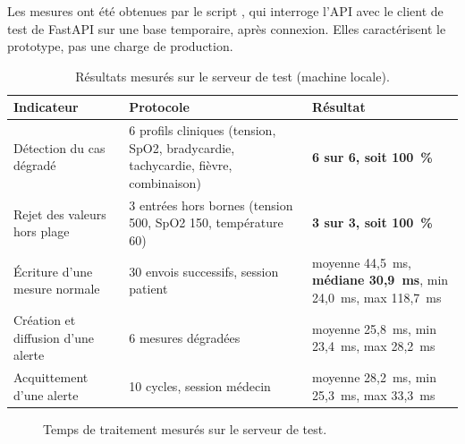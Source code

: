 Les mesures ont été obtenues par le script , qui interroge l'\ac{API} avec le client de test de FastAPI sur une base temporaire, après connexion. Elles caractérisent le prototype, pas une charge de production.

\begin{table}[H]
\centering
\caption{Résultats mesurés sur le serveur de test (machine locale).}
\label{tab:resultats}
\small
\begin{tabularx}{\textwidth}{@{}X X X@{}}
\toprule
\textbf{Indicateur} & \textbf{Protocole} & \textbf{Résultat} \\
\midrule
Détection du cas dégradé & 6 profils cliniques (tension, \ac{SpO2}, bradycardie, tachycardie, fièvre, combinaison) & \textbf{6 sur 6, soit 100~\%} \\
Rejet des valeurs hors plage & 3 entrées hors bornes (tension 500, \ac{SpO2} 150, température 60) & \textbf{3 sur 3, soit 100~\%} \\
Écriture d'une mesure normale & 30 envois successifs, session patient & moyenne 44,5~ms, \textbf{médiane 30,9~ms}, min 24,0~ms, max 118,7~ms \\
Création et diffusion d'une alerte & 6 mesures dégradées & moyenne 25,8~ms, min 23,4~ms, max 28,2~ms \\
Acquittement d'une alerte & 10 cycles, session médecin & moyenne 28,2~ms, min 25,3~ms, max 33,3~ms \\
\bottomrule
\end{tabularx}
\end{table}

\begin{figure}[H]
\centering
{}
\caption{Temps de traitement mesurés sur le serveur de test.}
\label{fig:latences}
\end{figure}

